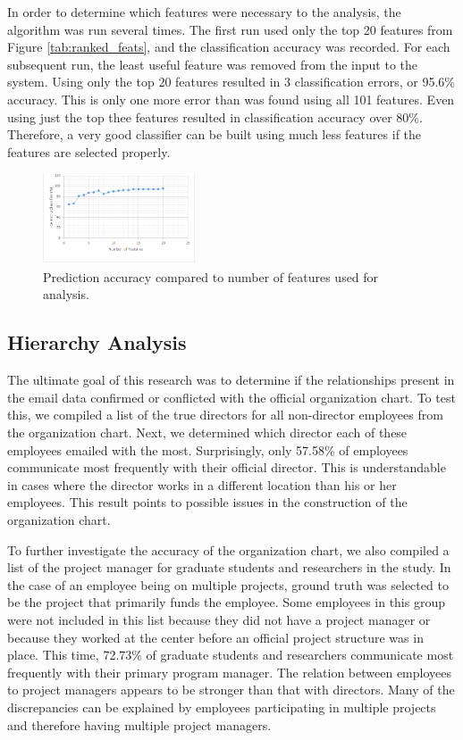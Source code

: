\documentclass{article}
\begin{document}
In order to determine which features were necessary to the analysis, the algorithm was run several times.  The first run used only the top 20 features from Figure \ref{tab:ranked_feats}, and the classification accuracy was recorded.  For each subsequent run, the least useful feature was removed from the input to the system.  Using only the top 20 features resulted in 3 classification errors, or 95.6\% accuracy.  This is only one more error than was found using all 101 features.  Even using just the top thee features resulted in classification accuracy over 80\%.  Therefore, a very good classifier can be built using much less features if the features are selected properly.
\begin{figure}[H]
    \centering
        \includegraphics[width=0.4\textwidth]{FeatureAnalysis}
        \caption{Prediction accuracy compared to number of features used for analysis.}
        \label{fig:feat_analysis}
\end{figure}

\subsection{Hierarchy Analysis}
The ultimate goal of this research was to determine if the relationships present in the email data confirmed or conflicted with the official organization chart.  To test this, we compiled a list of the true directors for all non-director employees from the organization chart.  Next, we determined which director each of these employees emailed with the most.  Surprisingly, only 57.58\% of employees communicate most frequently with their official director.  This is understandable in cases where the director works in a different location than his or her employees.  This result points to possible issues in the construction of the organization chart.
\par
To further investigate the accuracy of the organization chart, we also compiled a list of the project manager for graduate students and researchers in the study.  In the case of an employee being on multiple projects, ground truth was selected to be the project that primarily funds the employee.  Some employees in this group were not included in this list because they did not have a project manager or because they worked at the center before an official project structure was in place.  This time, 72.73\% of graduate students and researchers communicate most frequently with their primary program manager.  The relation between employees to project managers appears to be stronger than that with directors.  Many of the discrepancies can be explained by employees participating in multiple projects and therefore having multiple project managers.
\end{document}
